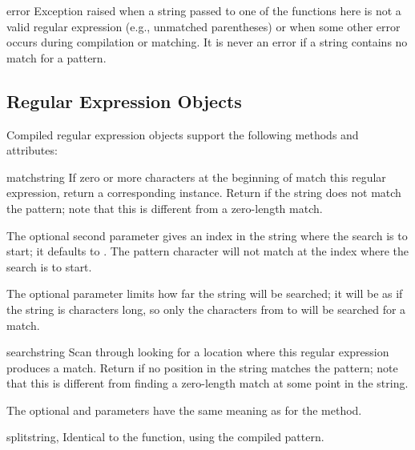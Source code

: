 \begin{excdesc}{error}
  Exception raised when a string passed to one of the functions here
  is not a valid regular expression (e.g., unmatched parentheses) or
  when some other error occurs during compilation or matching.  It is
  never an error if a string contains no match for a pattern.
\end{excdesc}


\subsection{Regular Expression Objects}
\label{re-objects}

Compiled regular expression objects support the following methods and
attributes:

\begin{methoddesc}[RegexObject]{match}{string}
  If zero or more characters at the beginning of  match
  this regular expression, return a corresponding
   instance.  Return  if the string does not
  match the pattern; note that this is different from a zero-length
  match.
  
  The optional second parameter  gives an index in the string
  where the search is to start; it defaults to .  The
  \character{\^} pattern character will not match at the index where the
  search is to start.

  The optional parameter  limits how far the string will
  be searched; it will be as if the string is  characters
  long, so only the characters from  to  will be
  searched for a match.
\end{methoddesc}

\begin{methoddesc}[RegexObject]{search}{string}
  Scan through  looking for a location where this regular
  expression produces a match.  Return  if no
  position in the string matches the pattern; note that this is
  different from finding a zero-length match at some point in the string.
  
  The optional  and  parameters have the same
  meaning as for the  method.
\end{methoddesc}

\begin{methoddesc}[RegexObject]{split}{string, }
Identical to the  function, using the compiled pattern.
\end{methoddesc}

